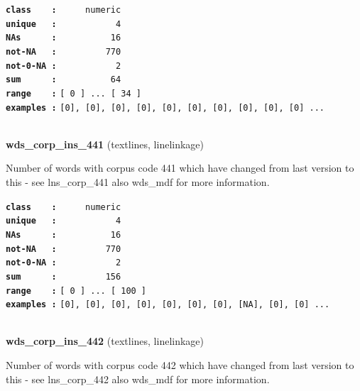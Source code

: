 \documentclass[]{article}
\begin{document}
\textbf{\texttt{class\ \ \ \ :}} \texttt{~~~~~numeric}\\
\textbf{\texttt{unique\ \ \ :}} \texttt{~~~~~~~~~~~4}\\
\textbf{\texttt{NAs\ \ \ \ \ \ :}} \texttt{~~~~~~~~~~16}\\
\textbf{\texttt{not-NA\ \ \ :}} \texttt{~~~~~~~~~770}\\
\textbf{\texttt{not-0-NA\ :}} \texttt{~~~~~~~~~~~2}\\
\textbf{\texttt{sum\ \ \ \ \ \ :}} \texttt{~~~~~~~~~~64}\\
\textbf{\texttt{range\ \ \ \ :}}
\texttt{{[}\ 0\ {]}\ ...\ {[}\ 34\ {]}}\\
\textbf{\texttt{examples\ :}}
\texttt{{[}0{]},\ {[}0{]},\ {[}0{]},\ {[}0{]},\ {[}0{]},\ {[}0{]},\ {[}0{]},\ {[}0{]},\ {[}0{]},\ {[}0{]}\ ...}\\

~

\textbf{wds\_corp\_ins\_441} (textlines, linelinkage)

Number of words with corpus code 441 which have changed from last
version to this - see lns\_corp\_441 also wds\_mdf for more information.

\textbf{\texttt{class\ \ \ \ :}} \texttt{~~~~~numeric}\\
\textbf{\texttt{unique\ \ \ :}} \texttt{~~~~~~~~~~~4}\\
\textbf{\texttt{NAs\ \ \ \ \ \ :}} \texttt{~~~~~~~~~~16}\\
\textbf{\texttt{not-NA\ \ \ :}} \texttt{~~~~~~~~~770}\\
\textbf{\texttt{not-0-NA\ :}} \texttt{~~~~~~~~~~~2}\\
\textbf{\texttt{sum\ \ \ \ \ \ :}} \texttt{~~~~~~~~~156}\\
\textbf{\texttt{range\ \ \ \ :}}
\texttt{{[}\ 0\ {]}\ ...\ {[}\ 100\ {]}}\\
\textbf{\texttt{examples\ :}}
\texttt{{[}0{]},\ {[}0{]},\ {[}0{]},\ {[}0{]},\ {[}0{]},\ {[}0{]},\ {[}0{]},\ {[}NA{]},\ {[}0{]},\ {[}0{]}\ ...}\\

~

\textbf{wds\_corp\_ins\_442} (textlines, linelinkage)

Number of words with corpus code 442 which have changed from last
version to this - see lns\_corp\_442 also wds\_mdf for more information.
\end{document}
